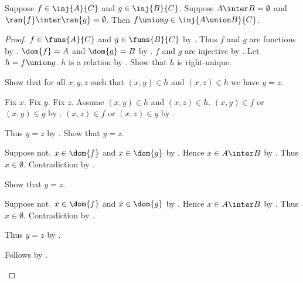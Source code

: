 \begin{proposition}\label{union_inj_disjoint}
    Suppose $f\in\inj{A}{C}$ and $g\in\inj{B}{C}$.
    Suppose $A\inter B=\emptyset$ and
        $\ran{f}\inter\ran{g}=\emptyset$.
    Then $f\union g\in\inj{A\union B}{C}$.
\end{proposition}
\begin{proof}
    $f\in\funs{A}{C}$ and $g\in\funs{B}{C}$ by .
    Thus $f$ and $g$ are functions by .
    $\dom{f}=A$ and $\dom{g}=B$ by .
    $f$ and $g$ are injective by .
    Let $h=f\union g$.
    $h$ is a relation by .
    Show that $h$ is right-unique.
    \begin{subproof}
        Show that for all $x,y,z$ such that
            $(x,y)\in h$ and $(x,z)\in h$ we have $y=z$.
        \begin{subproof}
            Fix $x$.
            Fix $y$.
            Fix $z$.
            Assume $(x,y)\in h$ and $(x,z)\in h$.
            $(x,y)\in f$ or $(x,y)\in g$ by .
            $(x,z)\in f$ or $(x,z)\in g$ by .
            \begin{byCase}
                Thus $y=z$ by .
                Show that $y=z$.
                \begin{subproof}
                    Suppose not.
                    $x\in\dom{f}$ and $x\in\dom{g}$ by .
                    Hence $x\in A\inter B$ by .
                    Thus $x\in\emptyset$.
                    Contradiction by .
                \end{subproof}
                Show that $y=z$.
                \begin{subproof}
                    Suppose not.
                    $x\in\dom{f}$ and $x\in\dom{g}$ by .
                    Hence $x\in A\inter B$ by .
                    Thus $x\in\emptyset$.
                    Contradiction by .
                \end{subproof}
                Thus $y=z$ by .
            \end{byCase}
        \end{subproof}
        Follows by .

\end{subproof}
\end{proof}
